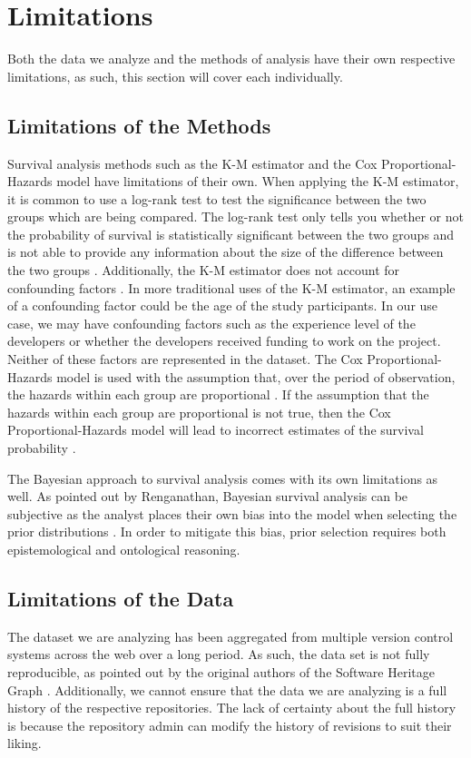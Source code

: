 \documentclass[conference]{IEEEtran}
\begin{document}
\section{Limitations}

Both the data we analyze and the methods of analysis have their own respective limitations, as such, this section will cover each individually.

\subsection{Limitations of the Methods}

Survival analysis methods such as the K-M estimator and the Cox Proportional-Hazards model have limitations of their own. When applying the K-M estimator, it is common to use a log-rank test to test the significance between the two groups which are being compared. The log-rank test only tells you whether or not the probability of survival is statistically significant between the two groups and is not able to provide any information about the size of the difference between the two groups \cite{stel2011kaplan}. Additionally, the K-M estimator does not account for confounding factors \cite{stel2011kaplan}. In more traditional uses of the K-M estimator, an example of a confounding factor could be the age of the study participants.
In our use case, we may have confounding factors such as the experience level of the developers or whether the developers received funding to work on the project.
Neither of these factors are represented in the dataset.
The Cox Proportional-Hazards model is used with the assumption that, over the period of observation, the hazards within each group are proportional \cite{stel2011cox}.
If the assumption that the hazards within each group are proportional is not true, then the Cox Proportional-Hazards model will lead to incorrect estimates of the survival probability \cite{stel2011cox}.

The Bayesian approach to survival analysis comes with its own limitations as well. As pointed out by Renganathan, Bayesian survival analysis can be subjective as the analyst places their own bias into the model when selecting the prior distributions \cite{renganathan2016overview}. In order to mitigate this bias, prior selection requires both epistemological and ontological reasoning.

\subsection{Limitations of the Data}

The dataset we are analyzing has been aggregated from multiple version control systems across the web over a long period. As such, the data set is not fully reproducible, as pointed out by the original authors of the Software Heritage Graph \cite{pietri2019software}. Additionally, we cannot ensure that the data we are analyzing is a full history of the respective repositories. The lack of certainty about the full history is because the repository admin can modify the history of revisions to suit their liking.



\end{document}
